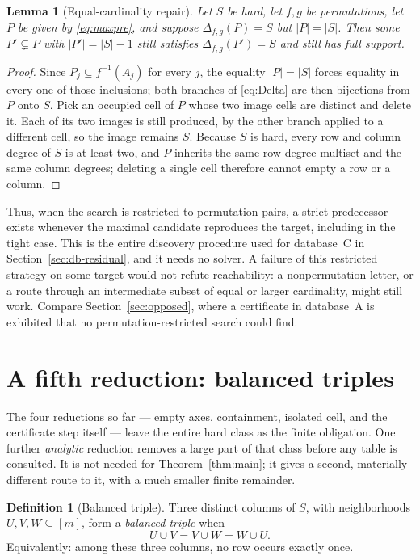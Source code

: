 \documentclass[11pt,letterpaper]{article}
\numberwithin{equation}{section}
\newtheorem{lemma}[theorem]{Lemma}
\theoremstyle{definition}
\newtheorem{definition}[theorem]{Definition}
\theoremstyle{remark}
\newcommand{\dbA}{\textsf{A}}
\newcommand{\dbC}{\textsf{C}}
\begin{document}
\begin{lemma}[Equal-cardinality repair]\label{lem:repair}
Let $S$ be hard, let $f,g$ be permutations, let $P$ be given by
\eqref{eq:maxpre}, and suppose $\Delta_{f,g}(P)=S$ but $|P|=|S|$. Then some
$P'\subsetneq P$ with $|P'|=|S|-1$ still satisfies $\Delta_{f,g}(P')=S$ and
still has full support.
\end{lemma}
\begin{proof}
Since $P_j\subseteq f^{-1}(A_j)$ for every $j$, the equality $|P|=|S|$ forces
equality in every one of those inclusions; both branches of \eqref{eq:Delta}
are then bijections from $P$ onto $S$. Pick an occupied cell of $P$ whose two
image cells are distinct and delete it. Each of its two images is still
produced, by the other branch applied to a different cell, so the image
remains $S$. Because $S$ is hard, every row and column degree of $S$ is at
least two, and $P$ inherits the same row-degree multiset and the same column
degrees; deleting a single cell therefore cannot empty a row or a column.
\end{proof}

Thus, when the search is restricted to permutation pairs, a strict
predecessor exists whenever the maximal candidate reproduces the target,
including in the tight case. This is the entire discovery procedure used for
database~\dbC{} in Section~\ref{sec:db-residual}, and it needs no solver.
A failure of this restricted strategy on some target would not refute
reachability: a nonpermutation letter, or a route through an intermediate
subset of equal or larger cardinality, might still work. Compare
Section~\ref{sec:opposed}, where a certificate in database~\dbA{} is
exhibited that no permutation-restricted search could find.

\section{A fifth reduction: balanced triples}
\label{sec:triple}
The four reductions so far --- empty axes, containment, isolated cell, and the
certificate step itself --- leave the entire hard class as the finite
obligation. One further \emph{analytic} reduction removes a large part of that
class before any table is consulted. It is not needed for
Theorem~\ref{thm:main}; it gives a second, materially different route to it,
with a much smaller finite remainder.

\begin{definition}[Balanced triple]\label{def:triple}
Three distinct columns of $S$, with neighborhoods $U,V,W\subseteq[m]$, form a
\emph{balanced triple} when
\begin{equation}\label{eq:balanced}
 U\cup V=V\cup W=W\cup U.
\end{equation}
Equivalently: among these three columns, no row occurs exactly once.
\end{definition}
\end{document}
